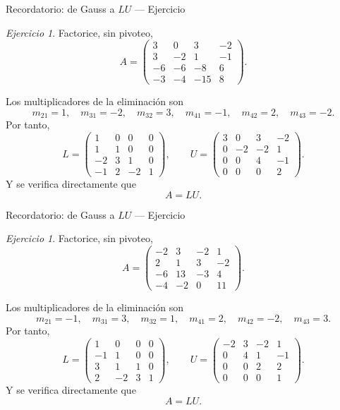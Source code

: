\documentclass[aspectratio=169,11pt]{beamer}
\theoremstyle{remark}
\newtheorem{Ejer}[definicion]{Ejercicio}
\begin{document}
\begin{frame}[shrink=5]{Recordatorio: de Gauss a $LU$ — Ejercicio}
\footnotesize
\begin{Ejer} Factorice, sin pivoteo,
\[
A=\begin{pmatrix}3 & 0 & 3 & -2\\3 & -2 & 1 & -1\\-6 & -6 & -8 & 6\\-3 & -4 & -15 & 8\end{pmatrix}.
\]

Los multiplicadores de la eliminación son
\[
m_{21}=1,\quad m_{31}=-2,\quad m_{32}=3,\quad m_{41}=-1,\quad m_{42}=2,\quad m_{43}=-2.
\]
Por tanto,
\[
L=\begin{pmatrix}1 & 0 & 0 & 0\\1 & 1 & 0 & 0\\-2 & 3 & 1 & 0\\-1 & 2 & -2 & 1\end{pmatrix},\qquad U=\begin{pmatrix}3 & 0 & 3 & -2\\0 & -2 & -2 & 1\\0 & 0 & 4 & -1\\0 & 0 & 0 & 2\end{pmatrix}.
\]
Y se verifica directamente que
\[
\boxed{A=LU}.
\]

\end{Ejer}
\end{frame}

\begin{frame}[shrink=5]{Recordatorio: de Gauss a $LU$ — Ejercicio}
\footnotesize
\begin{Ejer} Factorice, sin pivoteo,
\[
A=\begin{pmatrix}-2 & 3 & -2 & 1\\2 & 1 & 3 & -2\\-6 & 13 & -3 & 4\\-4 & -2 & 0 & 11\end{pmatrix}.
\]

Los multiplicadores de la eliminación son
\[
m_{21}=-1,\quad m_{31}=3,\quad m_{32}=1,\quad m_{41}=2,\quad m_{42}=-2,\quad m_{43}=3.
\]
Por tanto,
\[
L=\begin{pmatrix}1 & 0 & 0 & 0\\-1 & 1 & 0 & 0\\3 & 1 & 1 & 0\\2 & -2 & 3 & 1\end{pmatrix},\qquad U=\begin{pmatrix}-2 & 3 & -2 & 1\\0 & 4 & 1 & -1\\0 & 0 & 2 & 2\\0 & 0 & 0 & 1\end{pmatrix}.
\]
Y se verifica directamente que
\[
\boxed{A=LU}.
\]
\end{Ejer}
\end{frame}
\end{document}
